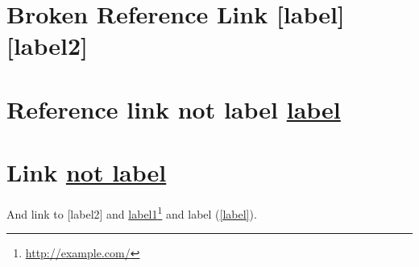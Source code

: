 \section{Broken Reference Link [label][label2]}
\label{brokenreferencelinklabellabel2}

\section{Reference link not label \href{http://example.com/}{label}}
\label{referencelinknotlabellabel}

\section{Link \href{http://example.net/}{not label}}
\label{linknotlabel}

And link to [label2] and \href{http://example.com/}{label1}\footnote{\href{http://example.com/}{http:/\slash example.com\slash }} and label (\autoref{label}).





